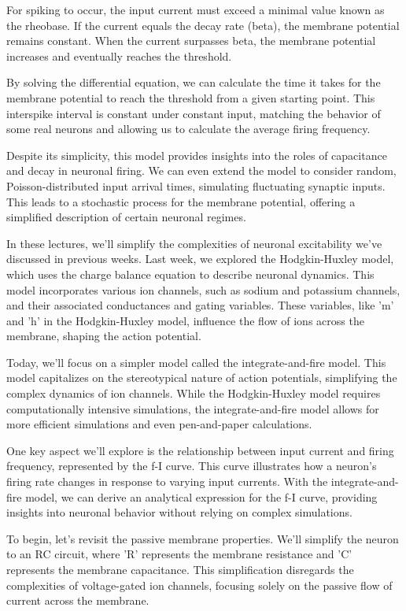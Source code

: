 For spiking to occur, the input current must exceed a minimal value known as the rheobase. If the current equals the decay rate (beta), the membrane potential remains constant. When the current surpasses beta, the membrane potential increases and eventually reaches the threshold.

By solving the differential equation, we can calculate the time it takes for the membrane potential to reach the threshold from a given starting point. This interspike interval is constant under constant input, matching the behavior of some real neurons and allowing us to calculate the average firing frequency.

Despite its simplicity, this model provides insights into the roles of capacitance and decay in neuronal firing. We can even extend the model to consider random, Poisson-distributed input arrival times, simulating fluctuating synaptic inputs. This leads to a stochastic process for the membrane potential, offering a simplified description of certain neuronal regimes.


In these lectures, we'll simplify the complexities of neuronal excitability we've discussed in previous weeks. Last week, we explored the Hodgkin-Huxley model, which uses the charge balance equation to describe neuronal dynamics. This model incorporates various ion channels, such as sodium and potassium channels, and their associated conductances and gating variables. These variables, like 'm' and 'h' in the Hodgkin-Huxley model, influence the flow of ions across the membrane, shaping the action potential.

Today, we'll focus on a simpler model called the integrate-and-fire model. This model capitalizes on the stereotypical nature of action potentials, simplifying the complex dynamics of ion channels. While the Hodgkin-Huxley model requires computationally intensive simulations, the integrate-and-fire model allows for more efficient simulations and even pen-and-paper calculations.

One key aspect we'll explore is the relationship between input current and firing frequency, represented by the f-I curve. This curve illustrates how a neuron's firing rate changes in response to varying input currents. With the integrate-and-fire model, we can derive an analytical expression for the f-I curve, providing insights into neuronal behavior without relying on complex simulations.

To begin, let's revisit the passive membrane properties. We'll simplify the neuron to an RC circuit, where 'R' represents the membrane resistance and 'C' represents the membrane capacitance. This simplification disregards the complexities of voltage-gated ion channels, focusing solely on the passive flow of current across the membrane.

